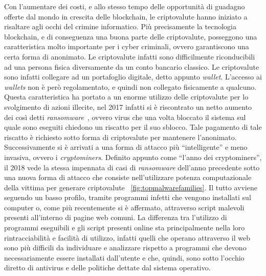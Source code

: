 \documentclass[conference, italian]{IEEEtran}
\begin{document}
Con l'aumentare dei costi, e allo stesso tempo delle opportunità di guadagno offerte dal mondo in crescita delle blockchain, le criptovalute hanno iniziato a risaltare agli occhi del crimine informatico. Più precisamente la tecnologia blockchain, e di conseguenza una buona parte delle criptovalute, posseggono una caratteristica molto importante per i cyber criminali, ovvero garantiscono una certa forma di anonimato. Le criptovalute infatti sono difficilmente riconducibili ad una persona fisica diversamente da un conto bancario classico. Le criptovalute sono infatti collegare ad un portafoglio digitale, detto appunto \emph{wallet}. L'accesso ai \emph{wallets} non è però regolamentato, e quindi non collegato fisicamente a qualcuno. Questa caratteristica ha portato a un enorme utilizzo delle criptovalute per lo svolgimento di azioni illecite, nel 2017 infatti si è riscontrato un netto aumento dei così detti \emph{ransomware}~\citep{skyboxtrends}, ovvero virus che una volta bloccato il sistema sul quale sono eseguiti chiedono un riscatto per il suo sblocco. Tale pagamento di tale riscatto è richiesto sotto forma di criptovalute per mantenere l'anonimato. Successivamente si è arrivati a una forma di attacco più ``intelligente'' e meno invasiva, ovvero i \emph{cryptominers}. Definito appunto come ``l'anno dei cryptominers'', il 2018 vede la stessa impennata di casi di \emph{ransomware} dell'anno precedente sotto una nuova forma di attacco che consiste nell'utilizzare potenza computazionale della vittima per generare criptovalute ~\ref{fig:topmalwarefamilies}. Il tutto avviene seguendo un basso profilo, tramite programmi infetti che vengono installati sul computer o, come più recentemente si è affermato, attraverso script malevoli presenti all'interno di pagine web comuni. La differenza tra l'utilizzo di programmi eseguibili e gli script presenti online sta principalmente nella loro rintracciabilità e facilità di utilizzo, infatti quelli che operano attraverso il web sono più difficili da individuare e analizzare rispetto a programmi che devono necessariamente essere installati dall'utente e che, quindi, sono sotto l'occhio diretto di antivirus e delle politiche dettate dal sistema operativo.\\
\end{document}
